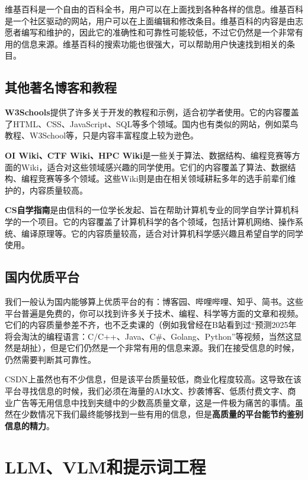 \documentclass[../main.tex]{subfiles}
\begin{document}
维基百科是一个自由的百科全书，用户可以在上面找到各种各样的信息。维基百科是一个社区驱动的网站，用户可以在上面编辑和修改条目。维基百科的内容是由志愿者编写和维护的，因此它的准确性和可靠性可能较低，不过它仍然是一个非常有用的信息来源。维基百科的搜索功能也很强大，可以帮助用户快速找到相关的条目。

\subsection{其他著名博客和教程}

\textbf{W3Schools}提供了许多关于开发的教程和示例，适合初学者使用。它的内容覆盖了HTML、CSS、JavaScript、SQL等多个领域。国内也有类似的网站，例如菜鸟教程、W3School等，只是内容丰富程度上较为逊色。

\textbf{OI Wiki、CTF Wiki、HPC Wiki}是一些关于算法、数据结构、编程竞赛等方面的Wiki，适合对这些领域感兴趣的同学使用。它们的内容覆盖了算法、数据结构、编程竞赛等多个领域。这些Wiki则是由在相关领域耕耘多年的选手前辈们维护的，内容质量较高。

\textbf{CS自学指南}是由信科的一位学长发起、旨在帮助计算机专业的同学自学计算机科学的一个项目。它的内容覆盖了计算机科学的各个领域，包括计算机网络、操作系统、编译原理等。它的内容质量较高，适合对计算机科学感兴趣且希望自学的同学使用。

\subsection{国内优质平台}

我们一般认为国内能够算上优质平台的有：博客园、哔哩哔哩、知乎、简书。这些平台普遍是免费的，你可以找到许多关于技术、编程、科学等方面的文章和视频。它们的内容质量参差不齐，也不乏卖课的（例如我曾经在B站看到过“预测2025年将会淘汰的编程语言：C/C++、Java、C\#、Golang、Python”等视频，当然这显然是胡扯），但是它们仍然是一个非常有用的信息来源。我们在接受信息的时候，仍然需要判断其可靠性。

\begin{tcolorbox}[title=说明]
  CSDN上虽然也有不少信息，但是该平台质量较低，商业化程度较高。这导致在该平台寻找信息的时候，我们必须在海量的AI水文、抄袭博客、低质付费文字、商业广告等无用信息中找到夹缝中的少数高质量文章，这是一件极为痛苦的事情。虽然在少数情况下我们最终能够找到一些有用的信息，但是\textbf{高质量的平台能节约鉴别信息的精力}。
\end{tcolorbox}

\section{LLM、VLM和提示词工程}
\end{document}
